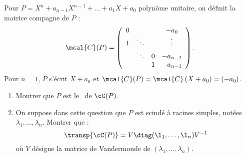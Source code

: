 Pour $P=X^n+a_{n-1} X^{n-1}+\ldots+a_1 X+a_0$ polynôme unitaire, on définit la matrice compagne de $P$ :
$$
\mcal{C}(P)=\left(\begin{array}{cccc}
0 & & & -a_0 \\
1 & \ddots & & \vdots \\
& \ddots & 0 & -a_{n-2} \\
& & 1 & -a_{n-1}
\end{array}\right).
$$
Pour $n=1$, $P$ s'écrit $X+a_0$ et $\mcal{C}(P)=\mcal{C}\left(X+a_0\right)=\left(-a_0\right)$.\\
\begin{enumerate}
\item Montrer que $P$ est le \poca\ de $\cC(P)$.
\item On suppose dans cette question que $P$ est scindé à racines simples, notées $\lambda_1, \ldots, \lambda_n$. Montrer que :
$$
\transp{\cC(P)}=V\diag(\l_1,\ldots,\l_n) V^{-1}
$$
où $V$ désigne la matrice de Vandermonde de $\left(\lambda_1, \ldots, \lambda_n\right)$.                                                                                                                                 \end{enumerate}
